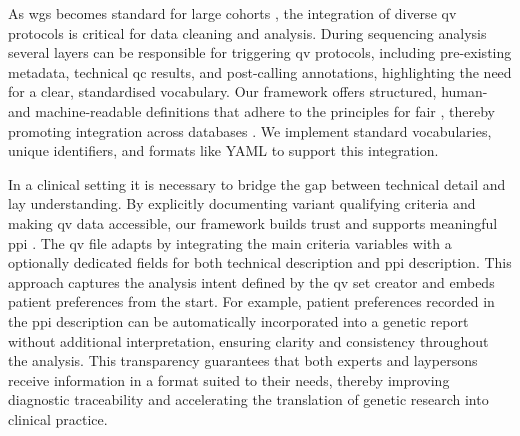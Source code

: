 As \ac{wgs} becomes standard for large cohorts \cite{lee2018gene, jansen2019genome}, the integration of diverse \ac{qv} protocols is critical for data cleaning and analysis. 
During sequencing analysis several layers can be responsible for triggering \ac{qv} protocols, including
pre-existing metadata, technical \ac{qc} results, and post-calling annotations,
highlighting the need for a clear, standardised vocabulary. Our framework offers structured, human- and machine-readable definitions that adhere to the principles for  \ac{fair} \cite{wilkinson2016fair}, thereby promoting  integration across databases \cite{van2023bridging, toure2023fairification}.
We implement standard vocabularies, unique identifiers, and formats like YAML to support this integration.


In a clinical setting it is necessary to bridge the gap between technical detail and lay understanding. By explicitly documenting variant qualifying criteria and making \ac{qv} data accessible, our framework builds trust and supports meaningful \ac{ppi} \cite{morris_answer_2011}. The \ac{qv} file adapts by integrating the main criteria variables with a optionally dedicated fields for both technical description and \ac{ppi} description. This approach captures the analysis intent defined by the \ac{qv} set creator and embeds patient preferences from the start. %
For example, patient preferences recorded in the \ac{ppi} description can be automatically incorporated into a genetic report without additional interpretation, ensuring clarity and consistency throughout the analysis. This transparency guarantees that both experts and laypersons receive information in a format suited to their needs, thereby improving diagnostic traceability and accelerating the translation of genetic research into clinical practice.


